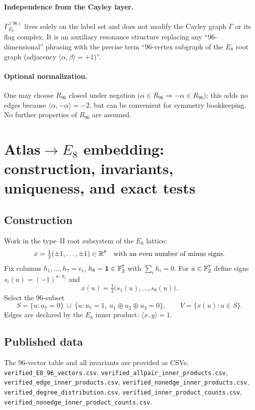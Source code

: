 \documentclass[12pt]{article}
\begin{document}
\paragraph{Independence from the Cayley layer.} $\Gamma_{E_8}^{(96)}$ lives solely on the label set and does not modify the Cayley graph $\Gamma$ or its flag complex. It is an auxiliary resonance structure replacing any ``96-dimensional'' phrasing with the precise term ``96-vertex subgraph of the $E_8$ root graph (adjacency $\langle\alpha,\beta\rangle=+1$)''.

\paragraph{Optional normalization.} One may choose $R_{96}$ closed under negation ($\alpha\in R_{96}\Rightarrow-\alpha\in R_{96}$); this adds no edges because $\langle\alpha,-\alpha\rangle=-2$, but can be convenient for symmetry bookkeeping. No further properties of $R_{96}$ are assumed.


\section{Atlas$\to E_8$ embedding: construction, invariants, uniqueness, and exact tests}

\subsection*{Construction}
Work in the type–II root subsystem of the $E_8$ lattice:
\[
x=\tfrac12(\pm1,\dots,\pm1)\in\Bbb R^8\quad\text{with an even number of minus signs}.
\]
Fix columns $h_1,\dots,h_7=e_i$, $h_8=\mathbf 1\in\Bbb F_2^7$ with $\sum_i h_i=0$.
For $u\in\Bbb F_2^7$ define signs $s_i(u)=(-1)^{u\cdot h_i}$ and
\[
x(u)=\tfrac12\big(s_1(u),\dots,s_8(u)\big).
\]
Select the $96$-subset
\[
S=\{u:u_7=0\}\ \cup\ \{u:u_7=1,\ u_1\oplus u_2\oplus u_3=0\},
\qquad
V=\{x(u):u\in S\}.
\]
Edges are declared by the $E_8$ inner product: $\langle x,y\rangle=1$.

\subsection*{Published data}
The 96-vector table and all invariants are provided as CSVs:
\texttt{verified\_E8\_96\_vectors.csv},
\texttt{verified\_allpair\_inner\_products.csv},
\texttt{verified\_edge\_inner\_products.csv},
\texttt{verified\_nonedge\_inner\_products.csv},
\texttt{verified\_degree\_distribution.csv},
\texttt{verified\_inner\_product\_counts.csv},
\texttt{verified\_nonedge\_inner\_product\_counts.csv}.
\end{document}
